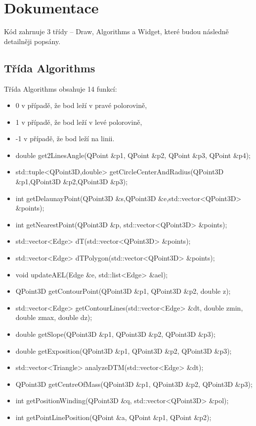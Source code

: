 \documentclass[11pt]{article}
\begin{document}
\clearpage


\section{Dokumentace}
Kód zahrnuje 3 třídy – Draw, Algorithms a Widget, které budou následně detailněji popsány.      

\subsection{Třída Algorithms}
Třída Algorithms obsahuje 14 funkcí:  

\begin{itemize}
	\item 0 v případě, že bod leží v pravé polorovině,
	\item 1 v případě, že  bod leží v levé polorovině,
	\item -1 v případě, že bod leží na linii.
\end{itemize}

\begin{itemize}
	\item double get2LinesAngle(QPoint \&p1, QPoint \&p2, QPoint \&p3, QPoint \&p4);
	\item std::tuple<QPoint3D,double> getCircleCenterAndRadius(QPoint3D \&p1,QPoint3D \&p2,QPoint3D \&p3);
	\item int getDelaunayPoint(QPoint3D \&s,QPoint3D \&e,std::vector<QPoint3D> \&points);
	\item int getNearestPoint(QPoint3D \&p, std::vector<QPoint3D> \&points);
	\item std::vector<Edge> dT(std::vector<QPoint3D> \&points);
	\item std::vector<Edge> dTPolygon(std::vector<QPoint3D> \&points);
	\item void updateAEL(Edge \&e, std::list<Edge> \&ael);
	\item QPoint3D getContourPoint(QPoint3D \&p1, QPoint3D \&p2, double z);
	\item std::vector<Edge> getContourLines(std::vector<Edge> \&dt, double zmin, double zmax, double dz);
	\item double getSlope(QPoint3D \&p1, QPoint3D \&p2, QPoint3D \&p3);
	\item double getExposition(QPoint3D \&p1, QPoint3D \&p2, QPoint3D \&p3);
	\item std::vector<Triangle> analyzeDTM(std::vector<Edge> \&dt);
	\item QPoint3D getCentreOfMass(QPoint3D \&p1, QPoint3D \&p2, QPoint3D \&p3);
	\item int getPositionWinding(QPoint3D \&q, std::vector<QPoint3D> \&pol);
	\item int getPointLinePosition(QPoint \&a, QPoint \&p1, QPoint \&p2);
\end{itemize}
\end{document}
